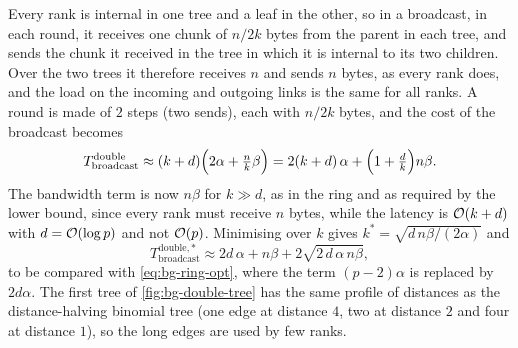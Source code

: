 Every rank is internal in one tree and a leaf in the other, so in a broadcast, in each round, it receives one chunk of $n/2k$ bytes from the parent in each tree, and sends the chunk it received in the tree in which it is internal to its two children.
Over the two trees it therefore receives $n$ and sends $n$ bytes, as every rank does, and the load on the incoming and outgoing links is the same for all ranks.
A round is made of $2$ steps (two sends), each with $n/2k$ bytes, and the cost of the broadcast becomes
\begin{equation}
  T^{\text{double}}_{\text{broadcast}} \approx (k+d)\Bigl(2\alpha+\tfrac{n}{k}\beta\Bigr)
  = 2(k+d)\,\alpha+\Bigl(1+\tfrac{d}{k}\Bigr)n\beta .
  \label{eq:bg-double-bcast}
\end{equation}
The bandwidth term is now $n\beta$ for $k\gg d$, as in the ring and as required by the lower bound, since every rank must receive $n$ bytes, while the latency is $\mathcal{O}\!\left(k+d\right)$ with $d=\mathcal{O}\!\left(\log p\right)$ and not $\mathcal{O}\!\left(p\right)$.
Minimising over $k$ gives $k^\ast=\sqrt{d\,n\beta/(2\alpha)}$ and
\begin{equation}
  T^{\text{double},\ast}_{\text{broadcast}}\approx 2d\,\alpha+n\beta+2\sqrt{2\,d\,\alpha\,n\beta},
\end{equation}
to be compared with \cref{eq:bg-ring-opt}, where the term $(p-2)\alpha$ is replaced by $2d\alpha$.
The first tree of \cref{fig:bg-double-tree} has the same profile of distances as the distance-halving binomial tree (one edge at distance $4$, two at distance $2$ and four at distance $1$), so the long edges are used by few ranks.

